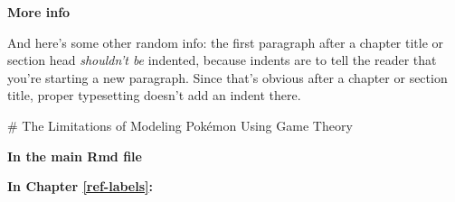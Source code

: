 \documentclass[12pt,twoside]{reedthesis}
\begin{document}
  \textbf{More info}
  
  And here's some other random info: the first paragraph after a chapter
  title or section head \emph{shouldn't be} indented, because indents are
  to tell the reader that you're starting a new paragraph. Since that's
  obvious after a chapter or section title, proper typesetting doesn't add
  an indent there.
  
  \appendix
  \# The Limitations of Modeling Pokémon Using Game Theory
  
  \textbf{In the main Rmd file}
  
  \begin{Shaded}
  \begin{Highlighting}[]
    \NormalTok{(}\NormalTok{, } \NormalTok{)}
    \NormalTok{(}\NormalTok{)}
  \end{Highlighting}
  \end{Shaded}
  
  \textbf{In Chapter \ref{ref-labels}:}
  
\end{document}
